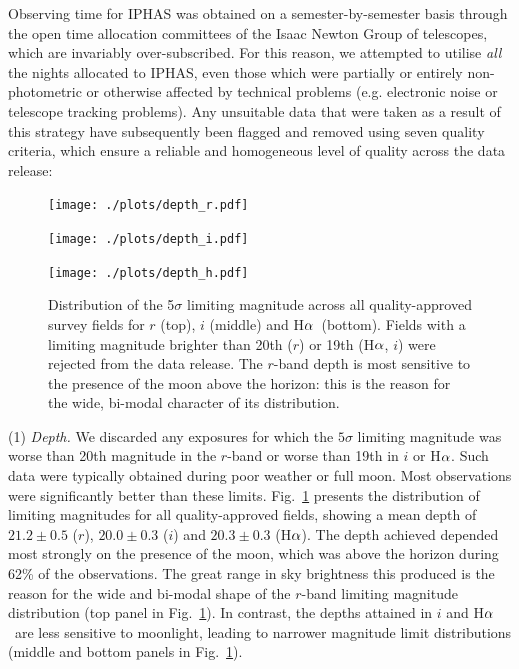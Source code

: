 \documentclass[useAMS,usenatbib]{mn2e}
\def\ha{\mbox{H$\rm \alpha$}}
\begin{document}
Observing time for IPHAS was obtained
on a semester-by-semester basis
through the open time allocation committees 
of the Isaac Newton Group of telescopes,
which are invariably over-subscribed.
For this reason, we attempted to utilise 
\emph{all} the nights allocated to IPHAS,
even those which were partially or entirely non-photometric
or otherwise affected by technical problems 
(e.g. electronic noise or telescope tracking problems).
Any unsuitable data that were taken as a result
of this strategy have subsequently been flagged and removed
using seven quality criteria,
which ensure a reliable and homogeneous level of quality
across the data release:

\begin{figure}
    \begin{minipage}[b]{\linewidth}
        \texttt{[image: ./plots/depth\_r.pdf]} 
    \end{minipage}
    \begin{minipage}[b]{\linewidth}
        \texttt{[image: ./plots/depth\_i.pdf]} 
    \end{minipage}
    \begin{minipage}[b]{\linewidth}
        \texttt{[image: ./plots/depth\_h.pdf]} 
    \end{minipage}
    \caption{Distribution of the 5$\sigma$ limiting magnitude
             across all quality-approved survey fields
             for $r$ (top), $i$ (middle) and \ha\ (bottom).
             Fields with a limiting magnitude brighter than
             20th ($r$) or 19th (\ha, $i$) were rejected
             from the data release.
             The $r$-band depth is most sensitive 
             to the presence of the moon above the horizon: 
             this is the reason for the wide, bi-modal character
             of its distribution.}
    \label{fig:depth}
\end{figure}

(1) \emph{Depth.} 
We discarded any exposures for which the $5\sigma$ limiting magnitude 
was worse than 20th magnitude in the $r$-band
or worse than 19th in $i$ or \ha. 
Such data were typically obtained during poor weather or full moon.
Most observations were significantly better than these limits.
Fig.~\ref{fig:depth} presents the distribution of limiting magnitudes
for all quality-approved fields,
showing a mean depth of 
$21.2\pm0.5$ ($r$), $20.0\pm0.3$ ($i$) and $20.3\pm0.3$ (\ha).
The depth achieved depended 
most strongly on the presence of the moon,
which was above the horizon during 62\% 
of the observations.  The great range in sky brightness this
produced is the reason for the wide and bi-modal shape
of the $r$-band limiting magnitude distribution 
(top panel in Fig.~\ref{fig:depth}).
In contrast, the depths attained in $i$ and \ha\ 
are less sensitive to moonlight, leading to
narrower magnitude limit distributions
(middle and bottom panels in Fig.~\ref{fig:depth}).
\end{document}
